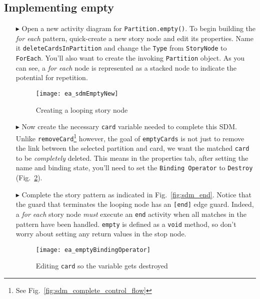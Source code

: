 \newpage
\hypertarget{emptyPartition vis}{}
\subsection{Implementing empty}
\visHeader

\begin{itemize}

\item[$\blacktriangleright$] Open a new activity diagram for \texttt{Partition.empty()}. To begin building the \emph{for each} pattern, quick-create a new story
node and edit its properties. Name it \texttt{deleteCardsInPartition} and change the \texttt{Type} from \texttt{StoryNode} to \texttt{ForEach}. You'll also want
to create the invoking \texttt{Partition} object. As you can see, a \emph{for each} node is represented as a stacked node to
indicate the potential for repetition.

\begin{figure}[htbp]
\begin{center}
  \texttt{[image: ea\_sdmEmptyNew]}
  \caption{Creating a looping story node}  
  \label{fig:sdm_foreach}
\end{center}
\end{figure}

\item[$\blacktriangleright$] Now create the necessary \texttt{card} variable needed to complete this SDM. Unlike \texttt{removeCard}\footnote{See
Fig.~\ref{fig:sdm_complete_control_flow}} however, the goal of \texttt{emptyCards} is not just to remove the link between the selected partition and card, we
want the matched \texttt{card} to be \emph{completely} deleted. This means in the properties tab, after setting the name and binding state, you'll need to set
the \texttt{Binding Operator} to \texttt{Destroy} (Fig.~\ref{fig:sdm_bindingOperator}).

\item[$\blacktriangleright$] Complete the story pattern as indicated in Fig.~\ref{fig:sdm_end}. Notice that the guard that terminates the looping node has an
\texttt{[end]} edge guard. Indeed, a \emph{for each} story node \emph{must} execute an \texttt{end} activity when all matches in the pattern have been
handled. \texttt{empty} is defined as a \texttt{void} method, so don't worry about setting any return values in the stop node.

\begin{figure}[htbp]
\begin{center}
  \texttt{[image: ea\_emptyBindingOperator]}
  \caption{Editing \texttt{card} so the variable gets destroyed}  
  \label{fig:sdm_bindingOperator}
\end{center}
\end{figure}


\end{itemize}
